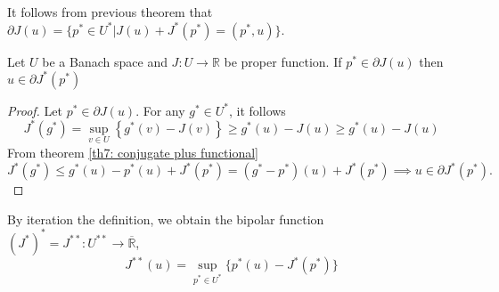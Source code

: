 \begin{corollary}
	It follows from previous theorem that $\partial J(u)=\lbrace p^* \in U^* | J(u)+J^*(p^*)=(p^*, u)\rbrace$.
\end{corollary}
\begin{theorem}
	Let $U$ be a Banach space and $J:U\rightarrow \mathbb{R}$ be proper function. If $p^* \in \partial J(u)$ then $u\in \partial J^* (p^*)$
	\begin{proof}
		Let $p^*\in \partial J(u)$. For any $g^* \in U^*$, it follows \[J^*(g^*)=\sup_{v\in U} \left\lbrace
		g^*(v)-J(v)\right\rbrace\geq g^*(u)-J(u)\geq g^*(u)-J(u)\]
		From theorem \ref{th7: conjugate plus functional} 
		\[
		J^*(g^*)\leq g^*(u)-p^*(u)+J^*(p^*) = \left(g^* - p^* \right)(u)+J^*(p^*)\implies u\in \partial J^*(p^*).
		\]
	\end{proof}
\end{theorem}
By iteration the definition, we obtain the bipolar function
$(J^*)^*=J^{**}: U^{**}\rightarrow \overline{\mathbb{R}}$, 
\[
	J^{**}(u)=\sup_{p^*\in U^*} \lbrace p^*(u)-J^*(p^*) \rbrace
\]

